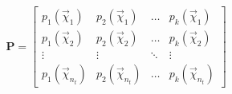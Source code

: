 \newpage


\begin{equation}\label{polynomial_matrix}
\mathbf{P} = 
\begin{bmatrix}
p_{1}(\vec{χ}_{1}) & p_{2}(\vec{χ}_{1}) & \ldots 
&  p_{k}(\vec{χ}_{1}) 
\\
p_{1}(\vec{χ}_{2}) & p_{2}(\vec{χ}_{2}) & \ldots 
&  p_{k}(\vec{χ}_{2}) 
\\
\vdots & \vdots & \ddots & \vdots 
\\
p_{1}(\vec{χ}_{n_{t}}) & p_{2}(\vec{χ}_{n_{t}}) & \ldots 
&  p_{k}(\vec{χ}_{n_{t}}) 
\end{bmatrix}
\end{equation}
\\[-3mm]

